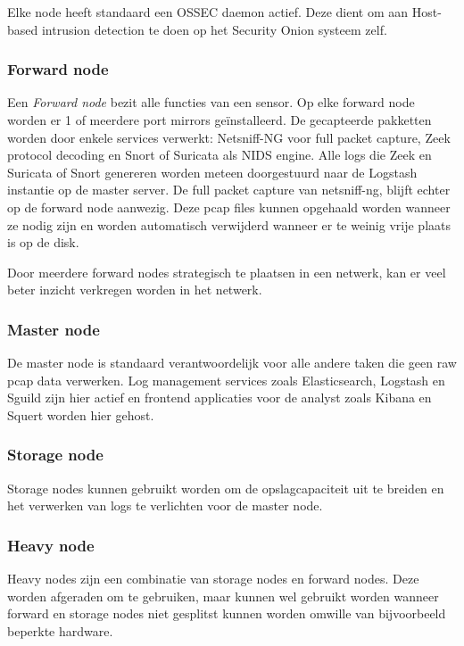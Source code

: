 \documentclass[a4paper,12pt]{report}
\begin{document}
Elke node heeft standaard een OSSEC daemon actief.
Deze dient om aan Host-based intrusion detection te doen op het Security Onion systeem zelf.

\subsubsection{Forward node}
Een \emph{Forward node} bezit alle functies van een sensor.
Op elke forward node worden er 1 of meerdere port mirrors geïnstalleerd.
De gecapteerde pakketten worden door enkele services verwerkt: Netsniff-NG voor full packet capture, Zeek protocol decoding en Snort of Suricata als NIDS engine.
Alle logs die Zeek en Suricata of Snort genereren worden meteen doorgestuurd naar de Logstash instantie op de master server.
De full packet capture van netsniff-ng, blijft echter op de forward node aanwezig.
Deze pcap files kunnen opgehaald worden wanneer ze nodig zijn en worden automatisch verwijderd wanneer er te weinig vrije plaats is op de disk.

Door meerdere forward nodes strategisch te plaatsen in een netwerk, kan er veel beter inzicht verkregen worden in het netwerk.

\subsubsection{Master node}
De master node is standaard verantwoordelijk voor alle andere taken die geen raw pcap data verwerken.
Log management services zoals Elasticsearch, Logstash en Sguild zijn hier actief en frontend applicaties voor de analyst zoals Kibana en Squert worden hier gehost.

\subsubsection{Storage node}
Storage nodes kunnen gebruikt worden om de opslagcapaciteit uit te breiden en het verwerken van logs te verlichten voor de master node.

\subsubsection{Heavy node}
Heavy nodes zijn een combinatie van storage nodes en forward nodes.
Deze worden afgeraden om te gebruiken, maar kunnen wel gebruikt worden wanneer forward en storage nodes niet gesplitst kunnen worden omwille van bijvoorbeeld beperkte hardware.

\autocite{so:docs}
\end{document}
